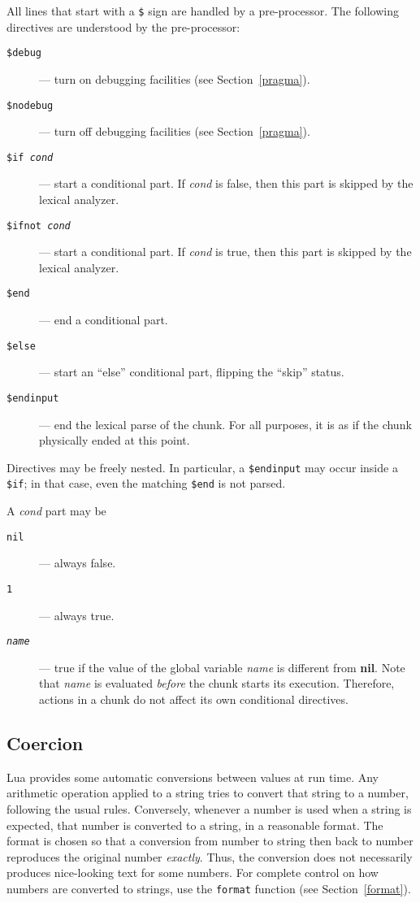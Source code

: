 \documentclass[11pt]{article}
\newcommand{\See}[1]{Section~\ref{#1}}
\newcommand{\see}[1]{(see \See{#1})}
\newcommand{\M}[1]{\rm\emph{#1}}
\newcommand{\T}[1]{{\tt #1}}
\newcommand{\nil}{{\bf nil}}
\newcommand{\Index}[1]{#1\index{#1}}
\begin{document}
All lines that start with a \verb|$| sign are handled by a pre-processor.
The following directives are understood by the pre-processor:
\begin{description}
\item[\T{\$debug}] --- turn on debugging facilities \see{pragma}.
\item[\T{\$nodebug}] --- turn off debugging facilities \see{pragma}.
\item[\T{\$if \M{cond}}] --- start a conditional part.
If \M{cond} is false, then this part is skipped by the lexical analyzer.
\item[\T{\$ifnot \M{cond}}] --- start a conditional part.
If \M{cond} is true, then this part is skipped by the lexical analyzer.
\item[\T{\$end}] --- end a conditional part.
\item[\T{\$else}] --- start an ``else'' conditional part,
flipping the ``skip'' status.
\item[\T{\$endinput}] --- end the lexical parse of the chunk.
For all purposes,
it is as if the chunk physically ended at this point.
\end{description}

Directives may be freely nested.
In particular, a \verb|$endinput| may occur inside a \verb|$if|;
in that case, even the matching \verb|$end| is not parsed.

A \M{cond} part may be
\begin{description}
\item[\T{nil}] --- always false.
\item[\T{1}] --- always true.
\item[\T{\M{name}}] --- true if the value of the
global variable \M{name} is different from \nil.
Note that \M{name} is evaluated \emph{before} the chunk starts its execution.
Therefore, actions in a chunk do not affect its own conditional directives.
\end{description}

\subsection{\Index{Coercion}} \label{coercion}

Lua provides some automatic conversions between values at run time.
Any arithmetic operation applied to a string tries to convert
that string to a number, following the usual rules.
Conversely, whenever a number is used when a string is expected,
that number is converted to a string, in a reasonable format.
The format is chosen so that
a conversion from number to string then back to number
reproduces the original number \emph{exactly}.
Thus,
the conversion does not necessarily produces nice-looking text for some numbers.
For complete control on how numbers are converted to strings,
use the \verb|format| function \see{format}.
\end{document}
